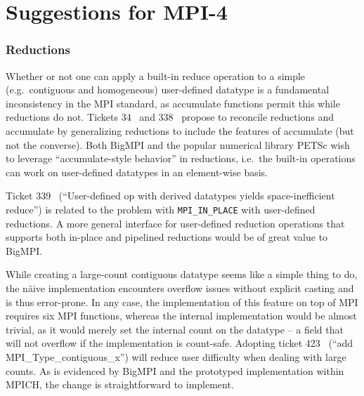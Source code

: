 
\section{Suggestions for MPI-4}
\label{sec:mpi4}

\subsubsection{Reductions}

Whether or not one can apply a built-in reduce operation to a simple 
(e.g.\ contiguous and homogeneous) user-defined datatype
is a fundamental inconsistency in the MPI standard, as accumulate
functions permit this while reductions do not.
Tickets 34~\cite{ticket34} and 338~\cite{ticket338}
propose to reconcile reductions and accumulate by generalizing
reductions to include the features of accumulate (but not the converse).
Both BigMPI and the popular numerical library PETSc wish to leverage 
``accumulate-style behavior'' in reductions, i.e.\  the built-in operations 
can work on user-defined datatypes in an element-wise basis.

Ticket 339~\cite{ticket339} %
(``User-defined op with derived datatypes yields space-inefficient reduce'')
is related to the problem with \texttt{MPI\_IN\_PLACE} with user-defined reductions.
A more general interface for user-defined reduction operations that supports both
in-place and pipelined reductions would be of great value to BigMPI.

While creating a large-count contiguous datatype seems like a simple thing to do,
the n{\"a}ive implementation encounters overflow issues without explicit casting and is
thus error-prone.  In any case, the implementation of this feature on top of MPI
requires six MPI functions, whereas the internal implementation would be almost trivial,
as it would merely set the internal count on the datatype -- a field that will not overflow 
if the implementation is count-safe.
Adopting ticket 423~\cite{ticket423} %
(``add MPI\_Type\_contiguous\_x'') will reduce user difficulty when dealing with large counts.
As is evidenced by BigMPI and the prototyped implementation within MPICH, 
the change is straightforward to implement.

